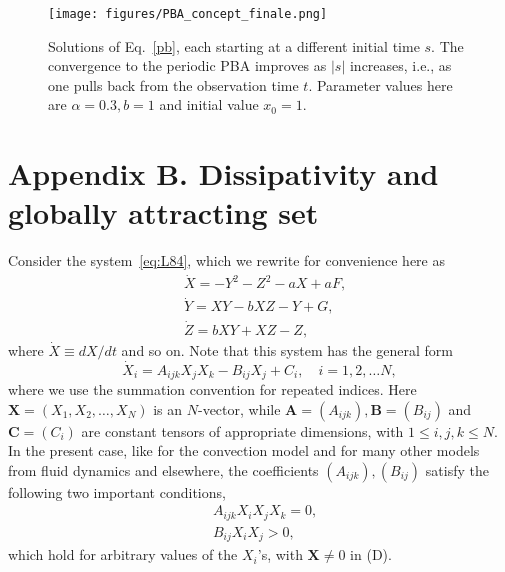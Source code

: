 \documentclass[%
 aip, cha,
 amsmath,amssymb,
 reprint,%
author-year,%
]{revtex4-1}
\newcommand{\X}{\mathbf X}
\newcommand{\0}{\mathbf 0}
\newcommand{\A}{\mathbf A}
\newcommand{\B}{\mathbf B}
\newcommand{\C}{\mathbf C}
\begin{document}
\begin{figure}    \texttt{[image: figures/PBA\_concept\_finale.png]}
    \caption{Solutions of Eq.~\eqref{pb}, each starting at a different initial time $s$. The convergence to the periodic PBA improves as $|s|$ increases, i.e., as one pulls back from the observation time $t$. Parameter values here are $\alpha = 0.3, b=1$ and initial value $x_0=1$. }
    \label{fig:PBA_concept}   
\end{figure}

\section*{Appendix B. Dissipativity and globally attracting set}
Consider the system~\eqref{eq:L84}, which we rewrite for convenience here as
\begin{subequations} 
	\begin{align}
		& \dot X = -Y^2 -Z^2 - aX + aF, \tag{B1.a} \\
		& \dot Y = XY - bXZ - Y + G, \tag{B1.b} \\
		&  \dot Z = bXY + XZ - Z,  \tag{B1.c}
	\end{align}
	\label{eq:Lor84}
\end{subequations}
where $\dot X \equiv {d X}/{d t}$ and so on. Note that this system has the general form 
\begin{equation} \label{eq:FD}
	\dot X_i = A_{ijk} X_j X_k - B_{ij} X_j + C_i, \quad i = 1,2, \ldots N, \tag{B2}
\end{equation}
where we use the summation convention for repeated indices. Here $\X = (X_1, X_2, \ldots, X_N)$ is an $N$-vector, while $\A = ( A_{ijk}), \B =  (B_{ij})$ and $\C = (C_i)$ are constant tensors of appropriate dimensions, with $1 \le i,j,k \le N.$ \\
In the present case, like for the \cite{Lorenz.1963} convection model and for many other models from fluid dynamics and elsewhere, the coefficients $( A_{ijk}), (B_{ij})$ satisfy the following two important conditions,
\begin{subequations} \label{eq:C+D}
	\begin{align}
		& A_{ijk} X_i X_j X_k = 0, \tag{C} \\ %
		& B_{ij} X_i X_j > 0, \tag{D} %
	\end{align}
\end{subequations}
which hold for arbitrary values of the $X_i$'s, with $\X \neq 0$ in (D).\\
\end{document}
